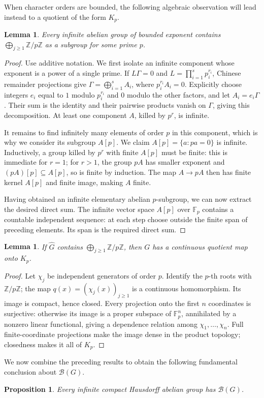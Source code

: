 \documentclass[11pt]{amsart}
\newtheorem{lemma}[theorem]{Lemma}
\newtheorem{proposition}[theorem]{Proposition}
\theoremstyle{definition}
\theoremstyle{remark}
\newcommand{\B}{\mathcal B}
\begin{document}
When character orders are bounded, the following algebraic observation will
lead instead to a quotient of the form \(K_p\).

\begin{lemma}\label{main:bounded}
Every infinite abelian group of bounded exponent contains
\(\bigoplus_{j\geq1}\mathbb Z/p\mathbb Z\) as a subgroup
for some prime \(p\).
\end{lemma}

\begin{proof}
Use additive notation. We first isolate an infinite component whose
exponent is a power of a single prime. If \(L\Gamma=0\) and
\(L=\prod_{i=1}^s p_i^{r_i}\), Chinese remainder projections give
\(\Gamma=\bigoplus_{i=1}^s A_i\), where \(p_i^{r_i}A_i=0\).
Explicitly choose integers \(e_i\) equal to \(1\) modulo
\(p_i^{r_i}\) and \(0\) modulo the other factors, and let
\(A_i=e_i\Gamma\). Their sum is the identity and their pairwise
products vanish on \(\Gamma\), giving this decomposition.
At least one component \(A\), killed by \(p^r\), is infinite.

It remains to find infinitely many elements of order \(p\) in this
component, which is why we consider its subgroup \(A[p]\).
We claim \(A[p]=\{a:pa=0\}\) is infinite. Inductively, a group
killed by \(p^r\) with finite \(A[p]\) must be finite:
this is immediate for \(r=1\); for \(r>1\), the group \(pA\)
has smaller exponent and \((pA)[p]\subseteq A[p]\), so is finite
by induction. The map \(A\to pA\) then has finite kernel
\(A[p]\) and finite image, making \(A\) finite.

Having obtained an infinite elementary abelian \(p\)-subgroup, we can
now extract the desired direct sum.
The infinite vector space \(A[p]\) over \(\mathbb F_p\)
contains a countable independent sequence: at each step choose
outside the finite span of preceding elements. Its span is the
required direct sum.
\end{proof}

\begin{lemma}\label{main:primequotient}
If \(\widehat G\) contains
\(\bigoplus_{j\geq1}\mathbb Z/p\mathbb Z\), then \(G\) has
a continuous quotient map onto \(K_p\).
\end{lemma}

\begin{proof}
Let \(\chi_j\) be independent generators of order \(p\).
Identify the \(p\)-th roots with \(\mathbb Z/p\mathbb Z\);
the map \(q(x)=(\chi_j(x))_{j\geq1}\) is a continuous homomorphism.
Its image is compact, hence closed. Every projection onto the
first \(n\) coordinates is surjective: otherwise its image is a
proper subspace of \(\mathbb F_p^n\), annihilated by a nonzero
linear functional, giving a dependence relation among
\(\chi_1,\ldots,\chi_n\).
Full finite-coordinate projections make the image dense in
the product topology; closedness makes it all of \(K_p\).
\end{proof}
We now combine the preceding results to obtain the following fundamental
conclusion about \(\B(G)\).
\begin{proposition}\label{main:allB}
Every infinite compact Hausdorff abelian group has \(\B(G)\).
\end{proposition}
\end{document}
